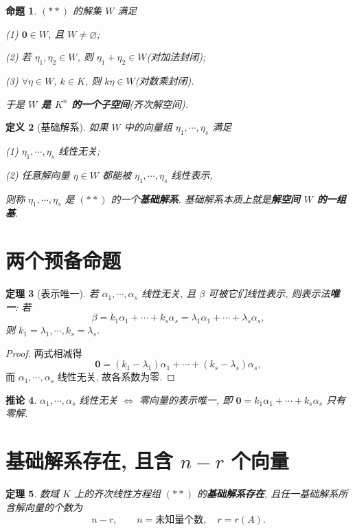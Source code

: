 \documentclass[UTF8,11pt]{ctexart}
\theoremstyle{cnthm}
\newtheorem{thm}{定理}[section]
\newtheorem{prop}[thm]{命题}
\newtheorem{cor}[thm]{推论}
\newtheorem{defn}[thm]{定义}
\begin{document}
\begin{prop}
$(**)$ 的解集 $W$ 满足

(1) $\mathbf 0\in W$, 且 $W\neq\varnothing$;

(2) 若 $\eta_1,\eta_2\in W$, 则 $\eta_1+\eta_2\in W$(对加法封闭);

(3) $\forall\eta\in W$, $k\in K$, 则 $k\eta\in W$(对数乘封闭).

于是 \textbf{$W$ 是 $K^n$ 的一个子空间}(齐次解空间).
\end{prop}

\begin{defn}[基础解系]
如果 $W$ 中的向量组 $\eta_1,\cdots,\eta_s$ 满足

(1) $\eta_1,\cdots,\eta_s$ 线性无关;

(2) 任意解向量 $\eta\in W$ 都能被 $\eta_1,\cdots,\eta_s$ 线性表示,

则称 $\eta_1,\cdots,\eta_s$ 是 $(**)$ 的一个\textbf{基础解系}. 基础解系本质上就是\textbf{解空间 $W$ 的一组基}.
\end{defn}

\section{两个预备命题}

\begin{thm}[表示唯一]
若 $\alpha_1,\cdots,\alpha_s$ 线性无关, 且 $\beta$ 可被它们线性表示, 则表示法\textbf{唯一}: 若
\[
\beta=k_1\alpha_1+\cdots+k_s\alpha_s=\lambda_1\alpha_1+\cdots+\lambda_s\alpha_s,
\]
则 $k_1=\lambda_1,\cdots,k_s=\lambda_s$.
\end{thm}

\begin{proof}
两式相减得
\[
\mathbf 0=(k_1-\lambda_1)\alpha_1+\cdots+(k_s-\lambda_s)\alpha_s ,
\]
而 $\alpha_1,\cdots,\alpha_s$ 线性无关, 故各系数为零.
\end{proof}

\begin{cor}
$\alpha_1,\cdots,\alpha_s$ 线性无关 $\iff$ 零向量的表示唯一, 即 $\mathbf 0=k_1\alpha_1+\cdots+k_s\alpha_s$ 只有零解.
\end{cor}

\section{基础解系存在, 且含 $n-r$ 个向量}

\begin{thm}
数域 $K$ 上的齐次线性方程组 $(**)$ 的\textbf{基础解系存在}, 且任一基础解系所含解向量的个数为
\[
n-r,\qquad n=\text{未知量个数},\quad r=r(A).
\]
\end{thm}
\end{document}
